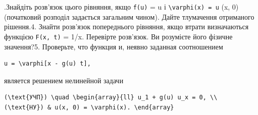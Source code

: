 \documentclass[
  ukrainian,
]{article}
\begin{document}
.Знайдіть розв'язок цього рівняння, якщо \texttt{f(u)} = u і
\texttt{\textbackslash{}varphi(x)\ =\ u} (x, 0) (початковий розподіл
задається загальним чином). Дайте тлумачення отриманого рішення.4.
Знайти розв'язок попереднього рівняння, якщо втрати визначаються
функцією \texttt{F(x,\ t)} = 1/x. Перевірте розв'язок. Ви розумієте його
фізичне значення?5. Проверьте, что функция и, неявно заданная
соотношением

\begin{verbatim}
u = \varphi[x - g(u) t],
\end{verbatim}

является решением нелинейной задачи

\begin{verbatim}
(\text{УЧП}) \quad \begin{array}{ll} u_1 + g(u) u_x = 0, \\ (\text{НУ}) & u(x, 0) = \varphi(x). \end{array}
\end{verbatim}
\end{document}
